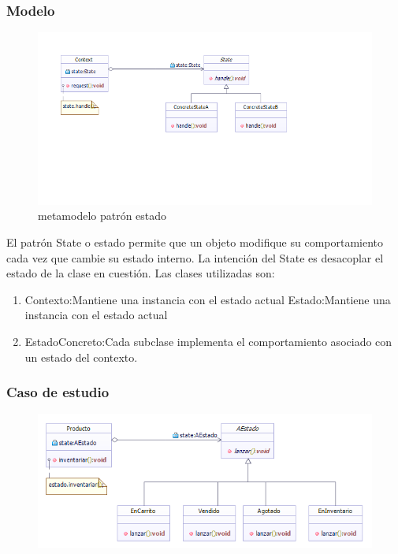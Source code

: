 \subsubsection{Modelo}
\begin{figure}[th!]
	\centering
	\includegraphics[width=0.7\linewidth]{arquitectura/imagenes/PatronEstado}
	\caption{metamodelo patrón estado}
	\label{fig:metamodelo patron estado}
\end{figure}
El patrón State o estado permite que un objeto modifique su comportamiento cada vez que cambie su estado interno. La intención del State es desacoplar el estado de la clase en cuestión. Las clases utilizadas son:
\begin{enumerate}
	\item Contexto:Mantiene una instancia con el estado actual Estado:Mantiene una instancia con el estado actual
	\item EstadoConcreto:Cada subclase implementa el comportamiento asociado con un estado del contexto.
\end{enumerate}  

\subsubsection{Caso de estudio}
\begin{figure}[th!]
	\centering
	\includegraphics[width=0.7\linewidth]{arquitectura/imagenes/PatronEstadoCasoEstudio}
	\caption{}
	\label{fig:patronestadocasoestudio}
\end{figure}


